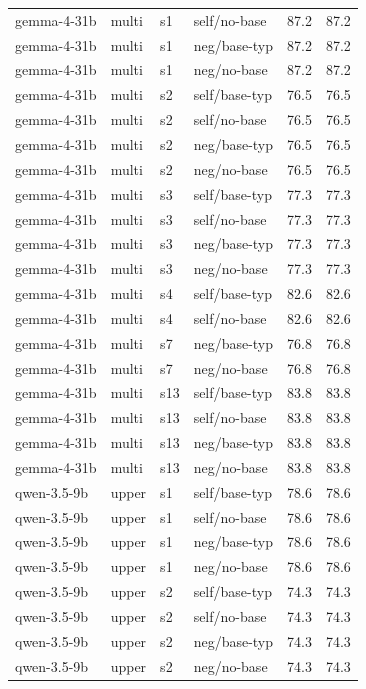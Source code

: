 {\begin{longtable}{llll rr}
gemma-4-31b & multi & s1 & self/no-base & 87.2 & 87.2 \\
gemma-4-31b & multi & s1 & neg/base-typ & 87.2 & 87.2 \\
gemma-4-31b & multi & s1 & neg/no-base & 87.2 & 87.2 \\
gemma-4-31b & multi & s2 & self/base-typ & 76.5 & 76.5 \\
gemma-4-31b & multi & s2 & self/no-base & 76.5 & 76.5 \\
gemma-4-31b & multi & s2 & neg/base-typ & 76.5 & 76.5 \\
gemma-4-31b & multi & s2 & neg/no-base & 76.5 & 76.5 \\
gemma-4-31b & multi & s3 & self/base-typ & 77.3 & 77.3 \\
gemma-4-31b & multi & s3 & self/no-base & 77.3 & 77.3 \\
gemma-4-31b & multi & s3 & neg/base-typ & 77.3 & 77.3 \\
gemma-4-31b & multi & s3 & neg/no-base & 77.3 & 77.3 \\
gemma-4-31b & multi & s4 & self/base-typ & 82.6 & 82.6 \\
gemma-4-31b & multi & s4 & self/no-base & 82.6 & 82.6 \\
gemma-4-31b & multi & s7 & neg/base-typ & 76.8 & 76.8 \\
gemma-4-31b & multi & s7 & neg/no-base & 76.8 & 76.8 \\
gemma-4-31b & multi & s13 & self/base-typ & 83.8 & 83.8 \\
gemma-4-31b & multi & s13 & self/no-base & 83.8 & 83.8 \\
gemma-4-31b & multi & s13 & neg/base-typ & 83.8 & 83.8 \\
gemma-4-31b & multi & s13 & neg/no-base & 83.8 & 83.8 \\
\midrule
qwen-3.5-9b & upper & s1 & self/base-typ & 78.6 & 78.6 \\
qwen-3.5-9b & upper & s1 & self/no-base & 78.6 & 78.6 \\
qwen-3.5-9b & upper & s1 & neg/base-typ & 78.6 & 78.6 \\
qwen-3.5-9b & upper & s1 & neg/no-base & 78.6 & 78.6 \\
qwen-3.5-9b & upper & s2 & self/base-typ & 74.3 & 74.3 \\
qwen-3.5-9b & upper & s2 & self/no-base & 74.3 & 74.3 \\
qwen-3.5-9b & upper & s2 & neg/base-typ & 74.3 & 74.3 \\
qwen-3.5-9b & upper & s2 & neg/no-base & 74.3 & 74.3 \\

\end{longtable}}
